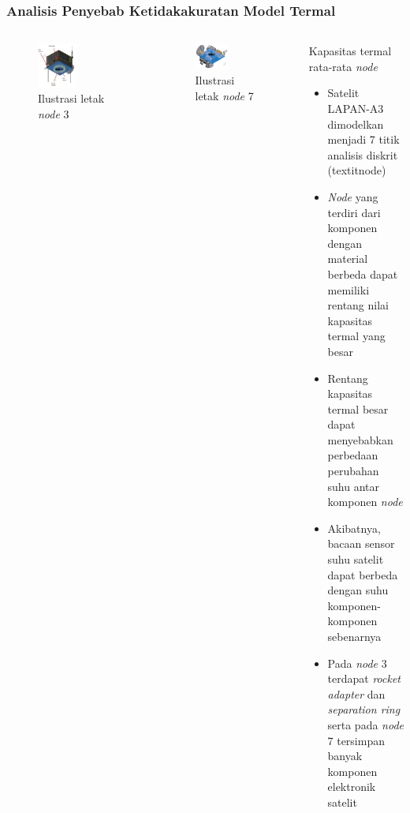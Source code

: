 \documentclass[8pt]{beamer}
\begin{document}
\begin{frame}
  \frametitle{Analisis Penyebab Ketidakakuratan Model Termal}
  \begin{columns}[T]
      \begin{figure}
          \includegraphics[width=0.5\textwidth]{figure/node3.png}
            \caption{Ilustrasi letak \textit{node} 3}
      \end{figure}
      \begin{figure}
          \includegraphics[width=0.5\textwidth]{figure/node7.png}
            \caption{Ilustrasi letak \textit{node} 7}
      \end{figure}
    \begin{block}{\center \normalsize Kapasitas termal rata-rata \textit{node}}
      \begin{itemize}
        \item Satelit LAPAN-A3 dimodelkan menjadi 7 titik analisis diskrit (textit{node})
      \item \textit{Node} yang terdiri dari komponen dengan material berbeda dapat memiliki rentang nilai kapasitas termal yang besar
      \item Rentang kapasitas termal besar dapat menyebabkan perbedaan perubahan suhu antar komponen \textit{node}
      \item Akibatnya, bacaan sensor suhu satelit dapat berbeda dengan suhu komponen-komponen sebenarnya
      \item Pada \textit{node} 3 terdapat \textit{rocket adapter} dan \textit{separation ring} serta pada \textit{node} 7 tersimpan banyak komponen elektronik satelit
      \end{itemize}
    \end{block}
  \end{columns}
\end{frame}
\end{document}
